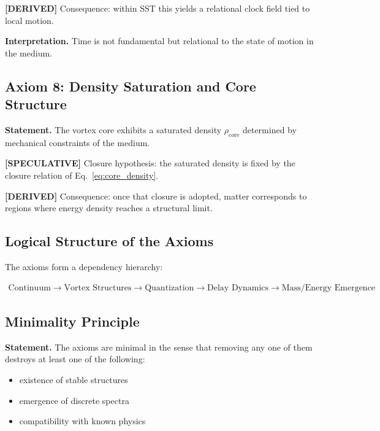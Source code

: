 \documentclass[11pt]{article}
\theoremstyle{definition}
\theoremstyle{plain}
\theoremstyle{remark}
\newcommand{\rhocore}{\rho_{\mathrm{core}}}
\begin{document}
        \textbf{[DERIVED]} Consequence: within SST this yields a relational clock field tied to local motion.
        
        \textbf{Interpretation.}
        Time is not fundamental but relational to the state of motion in the medium.
    
    \subsection{Axiom 8: Density Saturation and Core Structure}
        
        \textbf{Statement.}
        The vortex core exhibits a saturated density $\rhocore$ determined by mechanical constraints of the medium.
        
        \textbf{[SPECULATIVE]} Closure hypothesis: the saturated density is fixed by the closure relation of Eq.~\eqref{eq:core_density}.

        \textbf{[DERIVED]} Consequence: once that closure is adopted, matter corresponds to regions where energy density reaches a structural limit.
    
    \subsection{Logical Structure of the Axioms}
        
        The axioms form a dependency hierarchy:
        
        \begin{align}
            \text{Continuum}
            \rightarrow \text{Vortex Structures}
            \rightarrow \text{Quantization}
            \rightarrow \text{Delay Dynamics}
            \rightarrow \text{Mass/Energy Emergence}
        \end{align}
    
    \subsection{Minimality Principle}
        
        \textbf{Statement.}
        The axioms are minimal in the sense that removing any one of them destroys at least one of the following:
        
        \begin{itemize}
            \item existence of stable structures
            \item emergence of discrete spectra
            \item compatibility with known physics
        \end{itemize}
    
\end{document}
